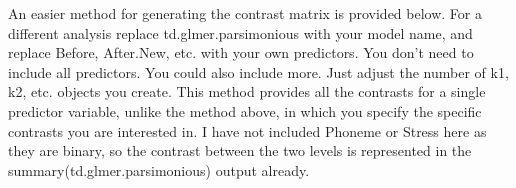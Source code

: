 \documentclass[
  10pt,
  letterpaper]{article}
\newenvironment{Shaded}{\begin{snugshade}}{\end{snugshade}}
\newcommand{\AttributeTok}[1]{\textcolor[rgb]{0.40,0.45,0.13}{#1}}
\newcommand{\FunctionTok}[1]{\textcolor[rgb]{0.28,0.35,0.67}{#1}}
\newcommand{\NormalTok}[1]{\textcolor[rgb]{0.00,0.23,0.31}{#1}}
\newcommand{\OtherTok}[1]{\textcolor[rgb]{0.00,0.23,0.31}{#1}}
\newcommand{\SpecialCharTok}[1]{\textcolor[rgb]{0.37,0.37,0.37}{#1}}
\newcommand{\StringTok}[1]{\textcolor[rgb]{0.13,0.47,0.30}{#1}}
\renewcommand\texttt[1]{{\ttfamily\color{BrickRed}#1}}
\begin{document}
An easier method for generating the contrast matrix is provided below.
For a different analysis replace \texttt{td.glmer.parsimonious} with
your model name, and replace \texttt{Before}, \texttt{After.New}, etc.
with your own predictors. You don't need to include all predictors. You
could also include more. Just adjust the number of \texttt{k1},
\texttt{k2}, etc. objects you create. This method provides all the
contrasts for a single predictor variable, unlike the method above, in
which you specify the specific contrasts you are interested in. I have
not included \texttt{Phoneme} or \texttt{Stress} here as they are
binary, so the contrast between the two levels is represented in the
\texttt{summary(td.glmer.parsimonious)} output already.

\begin{Shaded}
\end{Shaded}
\end{document}
